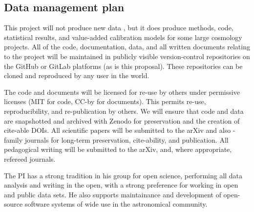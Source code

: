 \documentclass[12pt, fullpage, letterpaper]{article}
\begin{document}
\subsection*{Data management plan}

This project will not produce new data , but it does
produce methods, code, statistical results, and value-added
calibration models for some large cosmology projects.  All of the
code, documentation, data, and all written documents relating to the
project will be maintained in publicly visible version-control
repositories on the GitHub or GitLab platforms (as is this
proposal). These repositories can be cloned and reproduced by any user
in the world.

The code and documents will be licensed for re-use by others under permissive
licenses (MIT for code, CC-by for documents). This permits re-use, reproducibility,
and re-publication by others.
We will ensure that code and data are snapshotted and archived with Zenodo for
preservation and the creation of cite-able DOIs.
All scientific  papers will be submitted to the arXiv and also \AAS-family
journals for long-term preservation, cite-ability, and publication.
All pedagogical writing will be submitted to the arXiv, and, where appropriate,
refereed journals.

The PI has a strong tradition in his group for open science, performing
all data analysis and writing in the open, with a strong preference for working
in open and public data sets. He also supports maintainance and development of
open-source software systems of wide use in the astronomical community.
\end{document}

